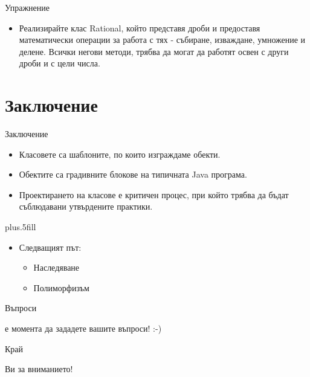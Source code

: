 \documentclass{beamer}
\begin{document}
\begin{frame}{Упражнение}
  \transdissolve
  \begin{itemize}
    \item Реализирайте клас Rational, който представя дроби и
      предоставя математически операции за работа с тях - събиране,
      изваждане, умножение и делене. Всички негови методи, трябва да
      могат да работят освен с други дроби и с цели числа.
  \end{itemize}
\end{frame}

\section*{Заключение}

\begin{frame}{Заключение}
  \transdissolve
  \begin{itemize}
  \item
    Класовете са шаблоните, по които изграждаме обекти.
  \item
    Обектите са градивните блокове на типичната Java програма.
  \item
    Проектирането на класове е критичен процес, при който трябва да
    бъдат съблюдавани утвърдените практики.
  \end{itemize}
  
  \vskip0pt plus.5fill
  \begin{itemize}
  \item
    Следващият път:
    \begin{itemize}
    \item
      Наследяване
    \item
      Полиморфизъм
    \end{itemize}
  \end{itemize}
\end{frame}

\begin{frame}{Въпроси}
  \transdissolve
  \begin{center}
     е момента да зададете вашите въпроси! :-)
  \end{center}
\end{frame}

\begin{frame}{Край}
  \transdissolve
  \begin{center}
     Ви за вниманието!
  \end{center}
\end{frame}
\end{document}
